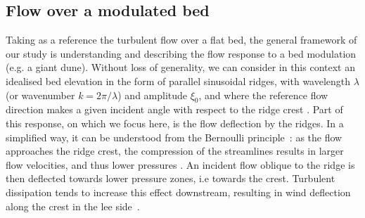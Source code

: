 \subsection{Flow over a modulated bed}
\label{theoretical_framework}
Taking as a reference the turbulent flow over a flat bed, the general framework of our study is understanding and describing the flow response to a bed modulation (e.g. a giant dune). Without loss of generality, we can consider in this context an idealised bed elevation in the form of parallel sinusoidal ridges, with wavelength $\lambda$ (or wavenumber $k = 2\pi/\lambda$) and amplitude $\xi_0$, and where the reference flow direction makes a given incident angle with respect to the ridge crest \citep{Andreotti2012}. Part of this response, on which we focus here, is the flow deflection by the ridges. In a simplified way, it can be understood from the Bernoulli principle~\citep{Hesp2015}: as the flow approaches the ridge crest, the compression of the streamlines results in larger flow velocities, and thus lower pressures \citep{Jackson1975}. An incident flow oblique to the ridge is then deflected towards lower pressure zones, i.e towards the crest. Turbulent dissipation tends to increase this effect downstream, resulting in wind deflection along the crest in the lee side~\citep{Gadal2019}.


